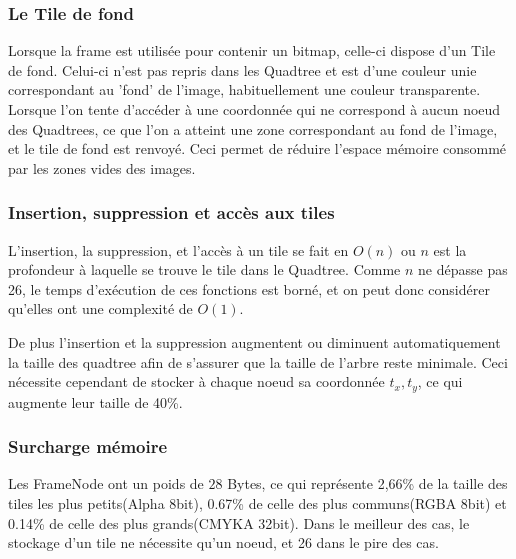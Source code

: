 			\subsubsection{Le Tile de fond}
				Lorsque la frame est utilisée pour contenir un bitmap, celle-ci dispose d'un Tile de fond. Celui-ci n'est pas repris
				dans les Quadtree et est d'une couleur unie correspondant au 'fond' de l'image, habituellement une couleur transparente.
				Lorsque l'on tente d'accéder à une coordonnée qui ne correspond à aucun noeud des Quadtrees, ce que l'on a atteint une zone
				correspondant au fond de l'image, et le tile de fond est renvoyé. Ceci permet de réduire l'espace mémoire consommé par les zones 
				vides des images.

			\subsubsection{Insertion, suppression et accès aux tiles}
				L'insertion, la suppression, et l'accès à un tile se fait en $O(n)$ ou $n$ est la profondeur à laquelle se trouve le tile dans 
				le Quadtree. Comme $n$ ne dépasse pas 26, le temps d'exécution de ces fonctions est borné, et on peut donc considérer qu'elles
				ont une complexité de $O(1)$. 
				
				De plus l'insertion et la suppression augmentent ou diminuent automatiquement la taille des 
				quadtree afin de s'assurer que la taille de l'arbre reste minimale. Ceci nécessite cependant de stocker à chaque noeud 
				sa coordonnée $t_x,t_y$, ce qui augmente leur taille de 40\%. %

			\subsubsection{Surcharge mémoire}
				Les FrameNode ont un poids de $28$ Bytes, ce qui représente 2,66\% de la taille des tiles les plus petits(Alpha 8bit), 0.67\% de celle des plus
				communs(RGBA 8bit)  et 0.14\% de celle des plus grands(CMYKA 32bit). Dans le meilleur des cas, le stockage d'un tile ne 
				nécessite qu'un noeud, et 26 dans le pire des cas. %

